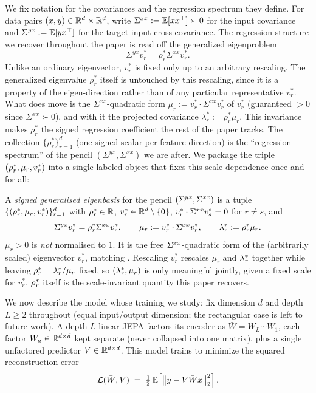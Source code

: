 We fix notation for the covariances and the regression spectrum they define.
For data pairs $(x,y)\in\mathbb{R}^d\times\mathbb{R}^d$, write
$\Sigma^{xx} := \mathbb{E}[xx^\top] \succ 0$ for the input covariance and
$\Sigma^{yx} := \mathbb{E}[yx^\top]$ for the target-input cross-covariance.
The regression structure we recover throughout the paper is read off the
generalized eigenproblem
\[
\Sigma^{yx} v_r^* = \rho_r^* \Sigma^{xx} v_r^*.
\]
Unlike an ordinary eigenvector, $v_r^*$ is fixed only up to an
arbitrary rescaling. The generalized eigenvalue $\rho_r^*$ itself is
untouched by this rescaling, since it is a property of the
eigen-direction rather than of any particular representative $v_r^*$.
What does move is the $\Sigma^{xx}$-quadratic form
$\mu_r := v_r^*\cdot\Sigma^{xx}v_r^*$ of $v_r^*$ (guaranteed $>0$ since
$\Sigma^{xx}\succ0$), and with it the projected covariance
$\lambda_r^* := \rho_r^*\mu_r$. This invariance makes $\rho_r^*$ the
signed regression coefficient the rest of the paper tracks. The
collection $\{\rho_r^*\}_{r=1}^d$ (one signed scalar per feature
direction) is the ``regression spectrum'' of the pencil
$(\Sigma^{yx}, \Sigma^{xx})$ we are after. We package the triple
$(\rho_r^*, \mu_r, v_r^*)$ into a single labeled object that fixes this
scale-dependence once and for all:

\begin{definition}
\label{def:eigenbasis}
A \emph{signed generalised eigenbasis} for the pencil $(\Sigma^{yx}, \Sigma^{xx})$ is
a tuple $\{(\rho_r^*, \mu_r, v_r^*)\}_{r=1}^{d}$ with
$\rho_r^* \in \mathbb{R}$, $v_r^* \in \mathbb{R}^d \setminus \{0\}$,
$v_r^* \cdot \Sigma^{xx} v_s^* = 0$ for $r \neq s$, and
\begin{equation}
\label{eq:gen-eigenpair}
\Sigma^{yx} v_r^* = \rho_r^* \Sigma^{xx} v_r^*,
\qquad
\mu_r := v_r^* \cdot \Sigma^{xx} v_r^*,
\qquad
\lambda_r^* := \rho_r^* \mu_r.
\end{equation}
$\mu_r > 0$ is \emph{not} normalised to $1$. It is the free
$\Sigma^{xx}$-quadratic form of the (arbitrarily scaled) eigenvector $v_r^*$,
matching . Rescaling $v_r^*$
rescales $\mu_r$ and $\lambda_r^*$ together while leaving
$\rho_r^* = \lambda_r^*/\mu_r$ fixed, so $(\lambda_r^*, \mu_r)$ is only
meaningful jointly, given a fixed scale for $v_r^*$. $\rho_r^*$ itself
is the scale-invariant quantity this paper recovers.
\end{definition}

\label{ssec:linear-jepa}
We now describe the model whose training we study: fix dimension $d$
and depth $L\ge2$ throughout (equal input/output dimension; the
rectangular case is left to future work). A depth-$L$ linear JEPA
factors its encoder as $\bar W = W_L\cdots W_1$,
each factor $W_a\in\mathbb{R}^{d\times d}$ kept separate (never collapsed into
one matrix), plus a single unfactored predictor $V\in\mathbb{R}^{d\times d}$.
This model trains to minimize the squared reconstruction error
\[
\mathcal{L}(\bar W, V) \;=\; \tfrac{1}{2}\,\mathbb{E}\!\left[\big\|y - V \bar W x\big\|_2^2\right].
\]

